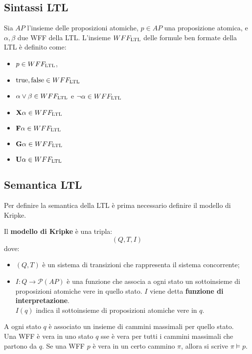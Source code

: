 \subsection{Sintassi LTL}
Sia $AP$ l'insieme delle proposizioni atomiche, $p \in AP$ una proposizione
atomica, e $\alpha, \beta$ due WFF della LTL.
L'insieme $WFF_{\textnormal{LTL}}$ delle formule ben formate della LTL è definito come:
\begin{itemize}
    \item $p \in WFF_{\textnormal{LTL}}$,
    \item $\textnormal{true}, \textnormal{false} \in WFF_{\textnormal{LTL}}$
    \item $\alpha \lor \beta \in WFF_{\textnormal{LTL}}$ e $\lnot \alpha \in WFF_{\textnormal{LTL}}$
    \item $\textnormal{\textbf{X}} \alpha \in WFF_{\textnormal{LTL}}$
    \item $\textnormal{\textbf{F}} \alpha \in WFF_{\textnormal{LTL}}$
    \item $\textnormal{\textbf{G}} \alpha \in WFF_{\textnormal{LTL}}$
    \item $\textnormal{\textbf{U}} \alpha \in WFF_{\textnormal{LTL}}$
\end{itemize}

\subsection{Semantica LTL}
Per definire la semantica della LTL è prima necessario definire il modello di
Kripke.
\begin{defn}
    Il \textbf{modello di Kripke} è una tripla:
    \[
        (Q, T, I)
    \]
    dove:
    \begin{itemize}
        \item $(Q, T)$ è un sistema di transizioni che rappresenta il sistema
        concorrente;
        \item $I: Q \rightarrow \mathcal{P}(AP)$ è una funzione che associa a
        ogni stato un sottoinsieme di proposizioni atomiche vere in quello
        stato. $I$ viene detta \textbf{funzione di interpretazione}.\\
        $I(q)$ indica il sottoinsieme di proposizioni atomiche vere in $q$.
    \end{itemize}
\end{defn}

A ogni stato $q$ è associato un insieme di cammini massimali per quello stato.\\
Una WFF è vera in uno stato $q$ sse è vera per tutti i cammini massimali che
partono da $q$. Se una WFF $p$ è vera in un certo cammino $\pi$, allora si
scrive $\pi \vDash p$.

